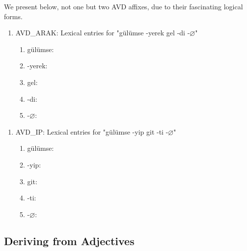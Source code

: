 \documentclass[11pt]{article} %
\begin{document}
We present below, not one but two AVD affixes, due to their fascinating logical forms.

\begin{enumerate}[resume*]
	\item AVD\_ARAK: Lexical entries for "gülümse -yerek gel -di -$\varnothing$"
	\begin{enumerate}[label=(\alph*), ref=(\alph*)]\itemsep1pt
	\item gülümse: 
	\item -yerek: 
	\item gel: 
	\item -di: 
	\item -$\varnothing$: 
	\end{enumerate}
\end{enumerate}

\begin{enumerate}[resume*]
	\item AVD\_IP: Lexical entries for "gülümse -yip git -ti -$\varnothing$"
	\begin{enumerate}[label=(\alph*), ref=(\alph*)]\itemsep1pt
	\item gülümse: 
	\item -yip: 
	\item git: 
	\item -ti: 
	\item -$\varnothing$: 
	\end{enumerate}
\end{enumerate}


\subsection{Deriving from Adjectives}
\end{document}
